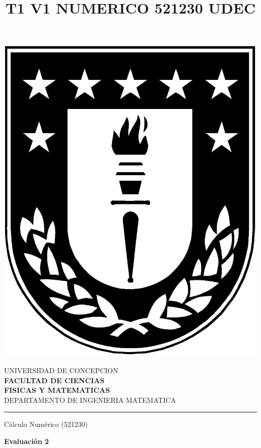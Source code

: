 \documentclass[11pt]{article}
\begin{document}
\title{T1 V1 NUMERICO 521230 UDEC}

\vspace*{-3cm}
\hspace{-3cm}
\begin{minipage}{0.12\textwidth}
\includegraphics[width=\textwidth]{logoudec.eps}
\end{minipage}
\hspace{5mm}
\begin{minipage}{0.9\textwidth}
UNIVERSIDAD DE CONCEPCION\\
{\small\small\bf 
FACULTAD DE CIENCIAS\\ 
FISICAS Y MATEMATICAS}\\
DEPARTAMENTO DE INGENIERIA MATEMATICA\\
\end{minipage}

\rule{16cm}{.5pt}

\vspace{0.2cm}
\centerline{\LARGE C\'alculo Num\'erico (521230)}

\vspace{0.1cm}
\centerline{\Large\bf Evaluaci\'on  2 }
\end{document}
